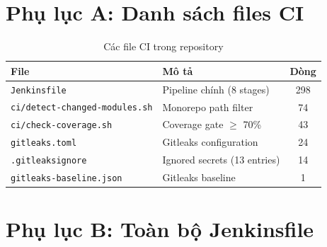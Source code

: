 \section*{Phụ lục A: Danh sách files CI}

\begin{table}[H]
\centering
\caption{Các file CI trong repository}
\begin{tabular}{|l|l|c|}
\hline
\textbf{File} & \textbf{Mô tả} & \textbf{Dòng} \\
\hline
\texttt{Jenkinsfile} & Pipeline chính (8 stages) & 298 \\
\hline
\texttt{ci/detect-changed-modules.sh} & Monorepo path filter & 74 \\
\hline
\texttt{ci/check-coverage.sh} & Coverage gate $\geq$ 70\% & 43 \\
\hline
\texttt{gitleaks.toml} & Gitleaks configuration & 24 \\
\hline
\texttt{.gitleaksignore} & Ignored secrets (13 entries) & 14 \\
\hline
\texttt{gitleaks-baseline.json} & Gitleaks baseline & 1 \\
\hline
\end{tabular}
\end{table}

\section*{Phụ lục B: Toàn bộ Jenkinsfile}
\vietnameselst

